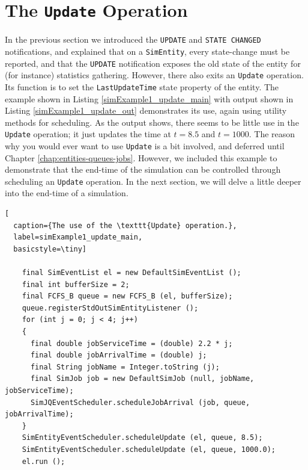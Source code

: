 \documentclass[12pt]{book}
\begin{document}
\section{The \texttt{Update} Operation}
\label{sec:guided:update}

In the previous section we introduced the
  \lstinline|UPDATE| and \lstinline|STATE CHANGED|
  notifications,
  and explained that on a \lstinline|SimEntity|,
  every state-change must be reported,
  and that the \lstinline|UPDATE| notification
  exposes the old state of the entity
  for (for instance) statistics gathering.
However, there also exits an \lstinline|Update|
  operation.
Its function is to set the \lstinline|LastUpdateTime|
  state property of the entity.
The example shown in
  Listing \ref{simExample1_update_main}
  with output
  shown in Listing \ref{simExample1_update_out}
  demonstrates its use,
  again using utility methods
  for scheduling.
As the output shows,
  there seems to be little use in the \lstinline|Update|
  operation; it just updates the time at $t=8.5$ and $t=1000$.
The reason why you would ever want to use \lstinline|Update|
  is a bit involved,
  and deferred until Chapter \ref{chap:entities-queues-jobs}.
However, we included this example to demonstrate
  that the end-time of the simulation can be
  controlled through scheduling an \lstinline|Update|
  operation.
In the next section, we will delve a little deeper
  into the end-time of a simulation.

\begin{lstfloat}
\begin{lstlisting}[
  caption={The use of the \texttt{Update} operation.},
  label=simExample1_update_main,
  basicstyle=\tiny]

    final SimEventList el = new DefaultSimEventList ();
    final int bufferSize = 2;
    final FCFS_B queue = new FCFS_B (el, bufferSize);
    queue.registerStdOutSimEntityListener ();
    for (int j = 0; j < 4; j++)
    {
      final double jobServiceTime = (double) 2.2 * j;
      final double jobArrivalTime = (double) j;
      final String jobName = Integer.toString (j);
      final SimJob job = new DefaultSimJob (null, jobName, jobServiceTime);
      SimJQEventScheduler.scheduleJobArrival (job, queue, jobArrivalTime);
    }
    SimEntityEventScheduler.scheduleUpdate (el, queue, 8.5);
    SimEntityEventScheduler.scheduleUpdate (el, queue, 1000.0);
    el.run ();

\end{lstlisting}
\end{lstfloat}
\end{document}
